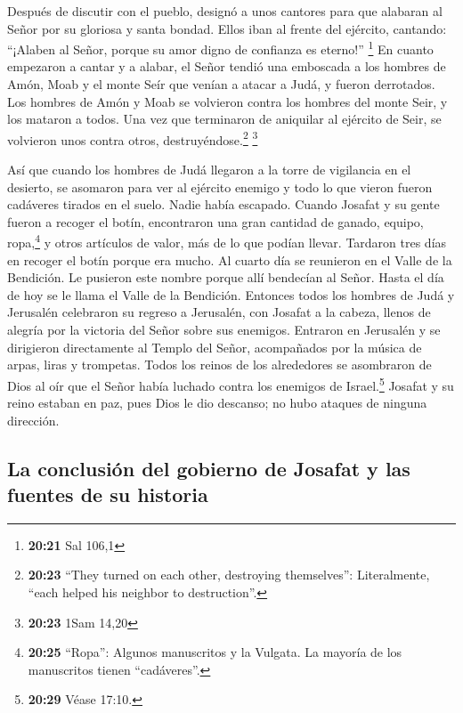  Después de discutir con el pueblo, designó a unos
cantores para que alabaran al Señor por su gloriosa y santa bondad.
Ellos iban al frente del ejército, cantando: ``¡Alaben al Señor, porque
su amor digno de confianza es eterno!'' \footnote{\textbf{20:21} Sal
  106,1}  En cuanto empezaron a cantar y a alabar, el
Señor tendió una emboscada a los hombres de Amón, Moab y el monte Seír
que venían a atacar a Judá, y fueron derrotados.  Los
hombres de Amón y Moab se volvieron contra los hombres del monte Seir, y
los mataron a todos. Una vez que terminaron de aniquilar al ejército de
Seir, se volvieron unos contra otros, destruyéndose.\footnote{\textbf{20:23}
  ``They turned on each other, destroying themselves'': Literalmente,
  ``each helped his neighbor to destruction''.} \footnote{\textbf{20:23}
  1Sam 14,20}

 Así que cuando los hombres de Judá llegaron a la torre
de vigilancia en el desierto, se asomaron para ver al ejército enemigo y
todo lo que vieron fueron cadáveres tirados en el suelo. Nadie había
escapado.  Cuando Josafat y su gente fueron a recoger el
botín, encontraron una gran cantidad de ganado, equipo, ropa,\footnote{\textbf{20:25}
  ``Ropa'': Algunos manuscritos y la Vulgata. La mayoría de los
  manuscritos tienen ``cadáveres''.} y otros artículos de valor, más de
lo que podían llevar. Tardaron tres días en recoger el botín porque era
mucho.  Al cuarto día se reunieron en el Valle de la
Bendición. Le pusieron este nombre porque allí bendecían al Señor. Hasta
el día de hoy se le llama el Valle de la Bendición. 
Entonces todos los hombres de Judá y Jerusalén celebraron su regreso a
Jerusalén, con Josafat a la cabeza, llenos de alegría por la victoria
del Señor sobre sus enemigos.  Entraron en Jerusalén y se
dirigieron directamente al Templo del Señor, acompañados por la música
de arpas, liras y trompetas.  Todos los reinos de los
alrededores se asombraron de Dios al oír que el Señor había luchado
contra los enemigos de Israel.\footnote{\textbf{20:29} Véase 17:10.}
 Josafat y su reino estaban en paz, pues Dios le dio
descanso; no hubo ataques de ninguna dirección.

\hypertarget{la-conclusiuxf3n-del-gobierno-de-josafat-y-las-fuentes-de-su-historia}{%
\subsection{La conclusión del gobierno de Josafat y las fuentes de su
historia}\label{la-conclusiuxf3n-del-gobierno-de-josafat-y-las-fuentes-de-su-historia}}


